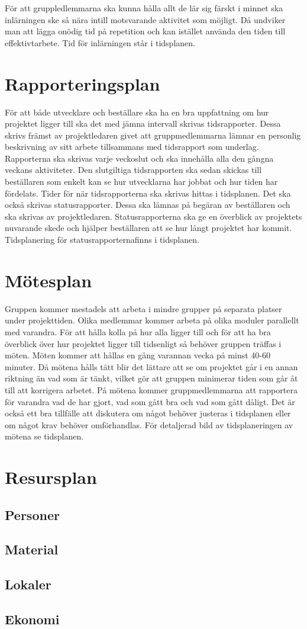 \documentclass[projektplan/plan.tex]{subfiles}
\begin{document}
För att gruppledlemmarna ska kunna hålla allt de lär sig färskt i minnet ska inlärningen ske så nära intill motsvarande aktivitet som möjligt. Då undviker man att lägga onödig tid på repetition och kan istället använda den tiden till effektivtarbete. Tid för inlärningen står i tidsplanen.

\section{Rapporteringsplan}
För att både utvecklare och beställare ska ha en bra uppfattning om hur projektet ligger till ska det med jämna intervall skrivas tidsrapporter. Dessa skrivs främst av projektledaren givet att gruppmedlemmarna lämnar en personlig beskrivning av sitt arbete tillsammans med tidsrapport som underlag. Rapporterna ska skrivas varje veckoslut och ska innehålla alla den gångna veckans aktiviteter. Den slutgiltiga tidsrapporten ska sedan skickas till beställaren som enkelt kan se hur utvecklarna har jobbat och hur tiden har fördelats. Tider för när tidsrapporterna ska skrivas hittas i tidsplanen.
Det ska också skrivas statusrapporter. Dessa ska lämnas på begäran av beställaren och ska skrivas av projektledaren. Statusrapporterna ska ge en överblick av projektets nuvarande skede och hjälper beställaren att se hur långt projektet har kommit. Tidsplanering för statusrapporternafinns i tidsplanen.
\section{Mötesplan}
Gruppen kommer mestadels att arbeta i mindre grupper på separata platser under projekttiden. Olika medlemmar kommer arbeta på olika moduler parallellt med varandra. För att hålla kolla på hur alla ligger till och för att ha bra överblick över hur projektet ligger till tidsenligt så behöver gruppen träffas i möten. Möten kommer att hållas en gång varannan vecka på minst 40-60 minuter. Då mötena hålls tätt blir det lättare att se om projektet går i en annan riktning än vad som är tänkt, vilket gör att gruppen minimerar tiden som går åt till att korrigera arbetet. På mötena kommer gruppmedlemmarna att rapportera för varandra vad de har gjort, vad som gått bra och vad som gått dåligt. Det är också ett bra tillfälle att diskutera om något behöver justeras i tidsplanen eller om något krav behöver omförhandlas. För detaljerad bild av tidsplaneringen av mötena se tidsplanen.
\section{Resursplan}
\subsection{Personer}
\subsection{Material}
\subsection{Lokaler}
\subsection{Ekonomi}
\end{document}
